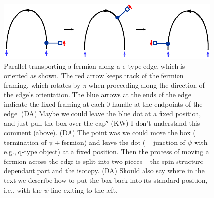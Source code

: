 \documentclass[12pt,a4paper]{article}
\newcounter{arrow}
\newcommand{\kw}[1]{{\color{kwcolor}\footnotesize{(KW) #1}}}
\newcommand{\dave}[1]{{\color{ao(english)}\footnotesize{(DA) #1}}}
\begin{document}
\begin{figure}
\begin{center}
\includegraphics{framing_rotation.pdf}
\end{center}
\caption{\label{framing_rot} Parallel-transporting a fermion along a q-type edge, which is oriented as shown. 
The red arrow keeps track of the fermion framing, which rotates by $\pi$ when proceeding along the direction of the edge's orientation.
The blue arrows at the ends of the edge indicate the fixed framing at each 0-handle at the endpoints of the edge. 
\dave{Maybe we could leave the blue dot at a fixed position, and just pull the box over the cap?
\kw{I don't understand this comment (above).}}
\dave{The point was we could move the box ( = termination of $\psi + \text{fermion}$) and leave the dot (= junction of $\psi$ with e.g., q-type object) at a fixed position.
Then the process of moving a fermion across the edge is split into two pieces -- the spin structure dependant part and the isotopy.
}
\dave{Should also say where in the text we describe how to put the box back into its standard position, 
i.e., with the $\psi$ line exiting to the left.}
}
  \label{framing_rotation}
\end{figure}
\end{document}
